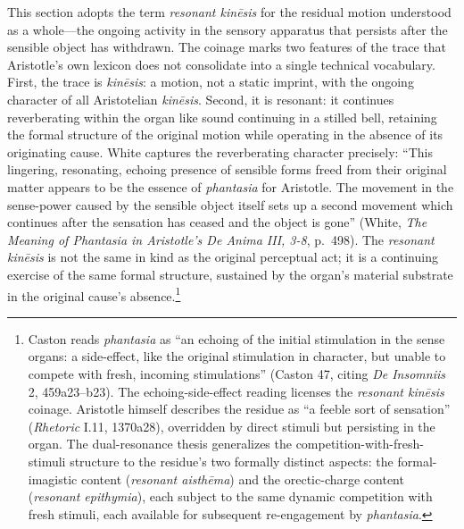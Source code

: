 This section adopts the term \textit{resonant kinēsis} for the residual motion understood as a whole---the ongoing activity in the sensory apparatus that persists after the sensible object has withdrawn. The coinage marks two features of the trace that Aristotle's own lexicon does not consolidate into a single technical vocabulary. First, the trace is \textit{kinēsis}: a motion, not a static imprint, with the ongoing character of all Aristotelian \textit{kinēsis}. Second, it is resonant: it continues reverberating within the organ like sound continuing in a stilled bell, retaining the formal structure of the original motion while operating in the absence of its originating cause. White captures the reverberating character precisely: ``This lingering, resonating, echoing presence of sensible forms freed from their original matter appears to be the essence of \textit{phantasia} for Aristotle. The movement in the sense-power caused by the sensible object itself sets up a second movement which continues after the sensation has ceased and the object is gone'' (White, \textit{The Meaning of Phantasia in Aristotle's De Anima III, 3-8}, p.~498). The \textit{resonant kinēsis} is not the same in kind as the original perceptual act; it is a continuing exercise of the same formal structure, sustained by the organ's material substrate in the original cause's absence.\footnote{Caston reads \textit{phantasia} as ``an echoing of the initial stimulation in the sense organs: a side-effect, like the original stimulation in character, but unable to compete with fresh, incoming stimulations'' (Caston 47, citing \textit{De Insomniis} 2, 459a23--b23). The echoing-side-effect reading licenses the \textit{resonant kinēsis} coinage. Aristotle himself describes the residue as ``a feeble sort of sensation'' (\textit{Rhetoric} I.11, 1370a28), overridden by direct stimuli but persisting in the organ. The dual-resonance thesis generalizes the competition-with-fresh-stimuli structure to the residue's two formally distinct aspects: the formal-imagistic content (\textit{resonant aisthēma}) and the orectic-charge content (\textit{resonant epithymia}), each subject to the same dynamic competition with fresh stimuli, each available for subsequent re-engagement by \textit{phantasia}.}


